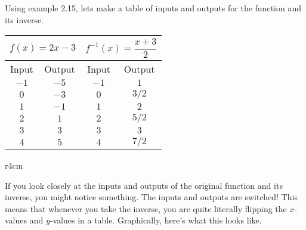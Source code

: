 \documentclass[../book.tex]{subfiles}
\begin{document}
Using example 2.15, lets make a table of inputs and outputs for the function and its inverse.
\begin{table}[!htbp]
\centering
\begin{tabular}{|c|c|c|c|}
\hline
\multicolumn{2}{c}{$f(x)=2x-3$} & \multicolumn{2}{c}{$f^{-1}(x)=\dfrac{x+3}{2}$}\\
\hline
Input   & Output   & Input    & Output   \\
$-1$ & $-5$ & $-1$ & $1$  \\
$0$  & $-3$ & $0$  & $3/2$  \\
$1$  & $-1$ & $1$  & $2$  \\
$2$  & $1$  & $2$  & $5/2$ \\
$3$  & $3$  & $3$  & $3$ \\
$4$  & $5$  & $4$  & $7/2$ \\
\hline
\end{tabular}
\end{table}
\begin{wrapfigure}{r}{4cm}
\end{wrapfigure}
If you look closely at the inputs and outputs of the original function and its inverse, you might notice something.  The inputs and outputs are switched!  This means that whenever you take the inverse, you are quite literally flipping the $x$-values and $y$-values in a table.  Graphically, here's what this looks like.
\end{document}
